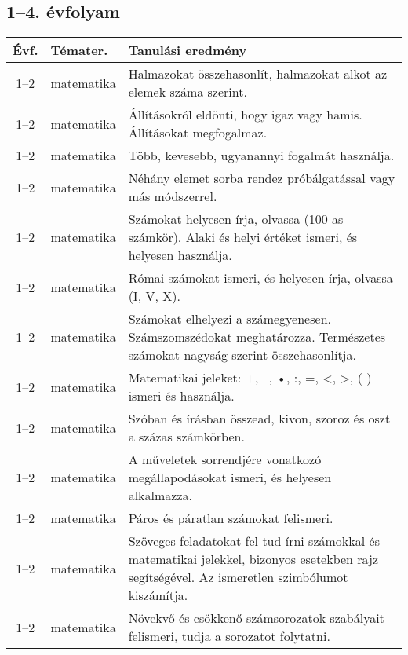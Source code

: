 \subsection{1--4. évfolyam}
\begin{small}
  \begin{longtable}{c | p{2cm} |  p{11cm} }
    \textbf{Évf.} & \textbf{Témater.} & \textbf{Tanulási eredmény} \\ \hline \hline
    \endhead

              1--2 & matematika & Halmazokat összehasonlít, halmazokat alkot az elemek száma szerint. \\ \hline
              1--2 & matematika & Állításokról eldönti, hogy igaz vagy hamis. Állításokat megfogalmaz. \\ \hline
              1--2 & matematika & Több, kevesebb, ugyanannyi fogalmát használja. \\ \hline
              1--2 & matematika & Néhány elemet sorba rendez próbálgatással vagy más módszerrel. \\ \hline
              1--2 & matematika & Számokat helyesen írja, olvassa (100-as számkör). Alaki és helyi értéket ismeri, és helyesen használja. \\ \hline
              1--2 & matematika & Római számokat ismeri, és helyesen írja, olvassa (I, V, X). \\ \hline
              1--2 & matematika & Számokat elhelyezi a számegyenesen. Számszomszédokat meghatározza. Természetes számokat nagyság szerint összehasonlítja. \\ \hline
              1--2 & matematika & Matematikai jeleket: +, –, •, :, =, <, >, ( ) ismeri és használja. \\ \hline
              1--2 & matematika & Szóban és írásban összead, kivon, szoroz és oszt a százas számkörben. \\ \hline
              1--2 & matematika & A műveletek sorrendjére vonatkozó megállapodásokat ismeri, és helyesen alkalmazza. \\ \hline
              1--2 & matematika & Páros és páratlan számokat felismeri. \\ \hline
              1--2 & matematika & Szöveges feladatokat fel tud írni számokkal és matematikai jelekkel, bizonyos esetekben rajz segítségével. Az ismeretlen szimbólumot kiszámítja. \\ \hline
              1--2 & matematika & Növekvő és csökkenő számsorozatok szabályait felismeri, tudja a sorozatot folytatni. \\ \hline

\end{longtable}
\end{small}
